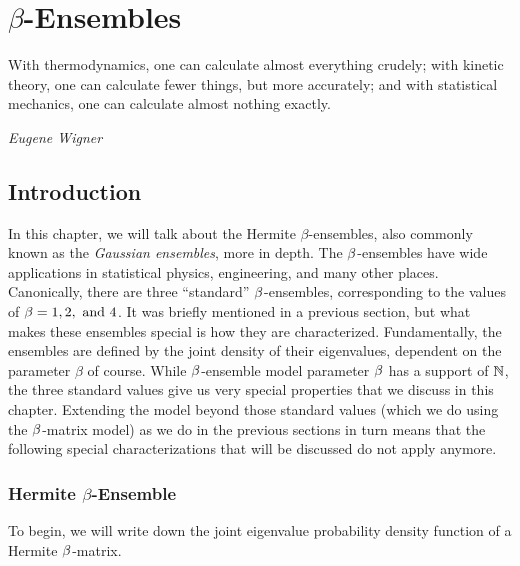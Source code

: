 
\chapter{$\beta$-Ensembles}

\epigraph{With thermodynamics, one can calculate almost everything crudely; with kinetic theory, one can calculate fewer things, but more accurately;
and with statistical mechanics, one can calculate almost nothing exactly.}{\textit{Eugene Wigner}}

\section{Introduction}

In this chapter, we will talk about the Hermite $\beta$-ensembles, also commonly known as the \textit{Gaussian ensembles}, more in depth.
The $\beta$-ensembles have wide applications in statistical physics, engineering, and many other places.
Canonically, there are three ``standard'' $\beta$-ensembles, corresponding to the values of $\beta = 1, 2, \text{ and } 4$.
It was briefly mentioned in a previous section, but what makes these ensembles special is how they are characterized.
Fundamentally, the ensembles are defined by the joint density of their eigenvalues, dependent on the parameter $\beta$ of course.
While $\beta$-ensemble model parameter $\beta$ has a support of $\mathbb{N}$, the three standard values give us very special properties that we discuss in this chapter.
Extending the model beyond those standard values (which we do using the $\beta$-matrix model) as we do in the previous sections in turn means that the following special characterizations
that will be discussed do not apply anymore.

\newpage
\subsection{Hermite $\beta$-Ensemble}

To begin, we will write down the joint eigenvalue probability density function of a Hermite $\beta$-matrix.

